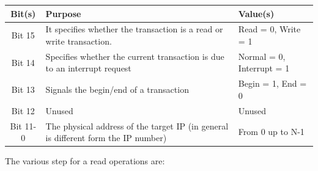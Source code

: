 \bigskip
\begin{center}
	\begin{tabular}{ | c | p{7 cm} |  l |}
		\hline
		Bit(s) & Purpose & Value(s)  \\ \hline
		Bit 15 & It specifies whether the transaction is a read or write transaction.  & Read = 0, Write = 1 
		 \\ \hline

		Bit 14 & Specifies whether the current transaction is due to an interrupt request   & Normal = 0, Interrupt  =  1
		\\ \hline
		
		Bit 13 & Signals the begin/end of a transaction & Begin  = 1, End = 0 
			\\ \hline
		Bit 12 & Unused & Unused 	
			
				\\ \hline		
				Bit 11-0 & The physical address of the target IP (in general is different form the IP number) &
				From 0 up to N-1  \\
		 
		
		
		\hline
	\end{tabular}
\end{center}
\bigskip
The various step for a read operations are:\\
